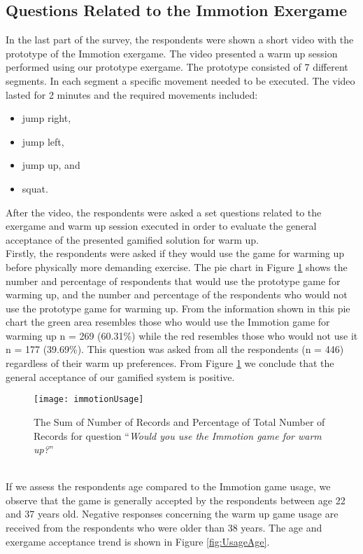 \subsection{Questions Related to the Immotion Exergame}
In the last part of the survey, the respondents were shown a short video with the prototype of the Immotion exergame. The video presented a warm up session performed using our prototype exergame. The prototype consisted of 7 different segments. In each segment a specific movement needed to be executed. The video lasted for 2 minutes and the required movements included: 
\begin{itemize}
\item jump right,
\item jump left,
\item jump up, and
\item squat.
\end{itemize}
After the video, the respondents were asked a set questions related to the exergame and warm up session executed in order to evaluate the general acceptance of the presented gamified solution for warm up.\\ Firstly, the respondents were asked if they would use the game for warming up before physically more demanding exercise. The pie chart in Figure  \ref{fig:immotionUsage} shows the number and percentage of respondents that would use the prototype game for warming up, and the number and percentage of the respondents who would not use the prototype game for warming up. From the information shown in this pie chart the green area resembles those who would use the Immotion game for warming up n = 269 (60.31\%) while the red resembles those who would not use it n = 177 (39.69\%). This question was asked from all the respondents (n = 446) regardless of their warm up preferences. From Figure \ref{fig:immotionUsage} we conclude that the general acceptance of our gamified system is positive.\\
\begin{figure}[h]
    \centering
    \texttt{[image: immotionUsage]}
    \caption[Results related to eexergame usage.]{The Sum of Number of Records and Percentage of Total Number of Records for question ``\textit{Would you use the Immotion game for warm up?}''}
    \label{fig:immotionUsage}
\end{figure}\\
 If we assess the respondents age compared to the Immotion game usage, we observe that the game is generally accepted by the respondents between age 22 and 37 years old. Negative responses concerning the warm up game usage are received from the respondents who were older than 38 years. The age and exergame acceptance trend is shown in Figure \ref{fig:UsageAge}.\\
